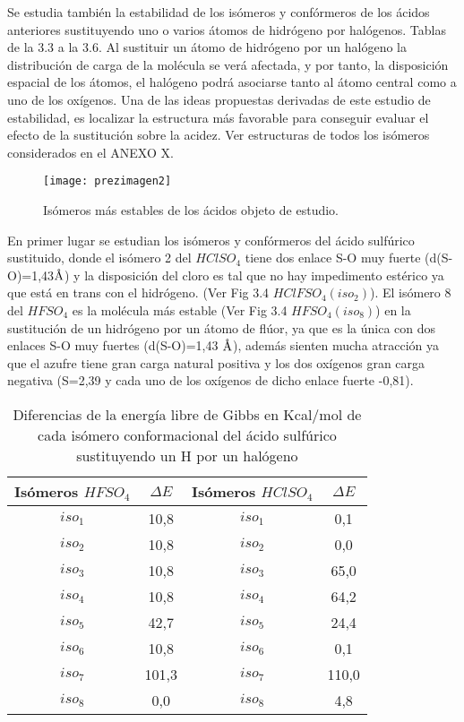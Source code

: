 Se estudia también la estabilidad de los isómeros y confórmeros de los ácidos anteriores sustituyendo uno o varios átomos de hidrógeno por halógenos. Tablas de la 3.3 a la 3.6. Al sustituir un átomo de hidrógeno por un halógeno la distribución de carga de la molécula se verá afectada, y por tanto, la disposición espacial de los átomos, el halógeno podrá asociarse tanto al átomo central como a uno de los oxígenos. Una de las ideas propuestas derivadas de este estudio de  estabilidad, es localizar la estructura más favorable para conseguir evaluar el efecto de la sustitución sobre la acidez. Ver estructuras de todos los isómeros considerados en el ANEXO X.

\begin{figure}[H]
	\centering
	\texttt{[image: prezimagen2]}
	\caption{Isómeros más estables de los ácidos objeto de estudio.}
\end{figure}

En primer lugar se estudian los isómeros y confórmeros del ácido sulfúrico sustituido, donde el isómero 2 del $HClSO_4$ tiene dos enlace S-O muy fuerte (d(S-O)=1,43$\mbox{\normalfont\AA}$) y la disposición del cloro es tal que no hay impedimento estérico ya que está en trans con el hidrógeno. (Ver Fig 3.4 \emph{$HClFSO_4(iso_2)$}). El isómero 8 del $HFSO_4$ es la molécula más estable (Ver Fig 3.4 \emph{$HFSO_4(iso_8)$}) en la sustitución de un hidrógeno por un átomo de flúor, ya que es la única con dos enlaces S-O muy fuertes (d(S-O)=1,43 $\mbox{\normalfont\AA}$), además sienten mucha atracción ya que el azufre tiene gran carga natural positiva y los dos oxígenos gran carga negativa (S=2,39 y cada uno de los oxígenos de dicho enlace fuerte -0,81). 

\begin{table}[H]
	\begin{center}
		\begin{tabular}{|c|c|c|c|}
			\hline
			Isómeros $HFSO_4$ & $\Delta E$ & Isómeros $HClSO_4$ & $\Delta E$ \\ \hline
			$iso_1$	& 10,8 & $iso_1$ & 0,1 \\ \hline
			$iso_2$ & 10,8 & $iso_2$ & 0,0 \\ \hline
			$iso_3$ & 10,8 & $iso_3$ & 65,0 \\ \hline
			$iso_4$ & 10,8 & $iso_4$ & 64,2 \\ \hline
			$iso_5$ & 42,7 & $iso_5$ & 24,4 \\ \hline
			$iso_6$ & 10,8 & $iso_6$ & 0,1 \\ \hline
			$iso_7$ &	101,3 & $iso_7$ & 110,0 \\ \hline
			$iso_8$ &	0,0 & $iso_8$ & 4,8 \\ \hline
		\end{tabular}
		\caption{Diferencias de la energía libre de Gibbs en Kcal/mol de cada isómero conformacional del ácido sulfúrico sustituyendo un H por un halógeno}
	\end{center}
\end{table}

